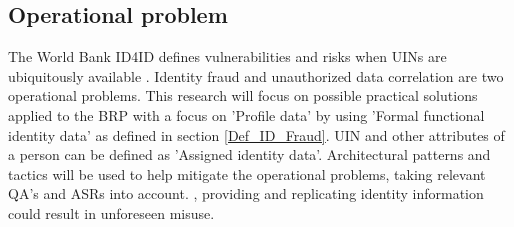\subsection{Operational problem}\label{OP}
The World Bank ID4ID defines vulnerabilities and risks when UINs are ubiquitously available \cite{WorldBank_protecting}. Identity fraud and unauthorized data correlation are two operational problems. This research will focus on possible practical solutions applied to the BRP with a focus  on 'Profile data' by using 'Formal functional identity data' as defined in section \ref{Def_ID_Fraud}. UIN and other attributes of a person can be defined as 'Assigned identity data'. Architectural patterns and tactics will be used to help mitigate the operational problems, taking relevant QA's and ASRs into account. , providing and replicating identity information could result in unforeseen misuse. 
%
